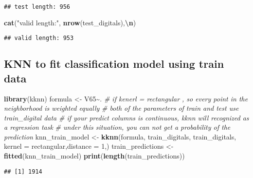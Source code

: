 \documentclass[
]{article}
\newenvironment{Shaded}{\begin{snugshade}}{\end{snugshade}}
\newcommand{\AttributeTok}[1]{\textcolor[rgb]{0.13,0.29,0.53}{#1}}
\newcommand{\CommentTok}[1]{\textcolor[rgb]{0.56,0.35,0.01}{\textit{#1}}}
\newcommand{\DecValTok}[1]{\textcolor[rgb]{0.00,0.00,0.81}{#1}}
\newcommand{\FunctionTok}[1]{\textcolor[rgb]{0.13,0.29,0.53}{\textbf{#1}}}
\newcommand{\NormalTok}[1]{#1}
\newcommand{\OtherTok}[1]{\textcolor[rgb]{0.56,0.35,0.01}{#1}}
\newcommand{\SpecialCharTok}[1]{\textcolor[rgb]{0.81,0.36,0.00}{\textbf{#1}}}
\newcommand{\StringTok}[1]{\textcolor[rgb]{0.31,0.60,0.02}{#1}}
\begin{document}
\begin{verbatim}
## test length: 956
\end{verbatim}

\begin{Shaded}
\begin{Highlighting}[]
\FunctionTok{cat}\NormalTok{(}\StringTok{"valid length:"}\NormalTok{, }\FunctionTok{nrow}\NormalTok{(test\_digitals),}\StringTok{\textquotesingle{}}\SpecialCharTok{\textbackslash{}n}\StringTok{\textquotesingle{}}\NormalTok{)}
\end{Highlighting}
\end{Shaded}

\begin{verbatim}
## valid length: 953
\end{verbatim}

\subsection{KNN to fit classification model using train
data}\label{knn-to-fit-classification-model-using-train-data}

\begin{Shaded}
\begin{Highlighting}[]
\FunctionTok{library}\NormalTok{(kknn)}
\NormalTok{formula }\OtherTok{\textless{}{-}}\NormalTok{ V65}\SpecialCharTok{\textasciitilde{}}\NormalTok{.}
\CommentTok{\# if kenerl = \textquotesingle{}rectangular\textquotesingle{} , so every point in the neighborhood is weighted equally}
\CommentTok{\# both of the parameters of train and test use train\_digital data}
\CommentTok{\# if  your predict columns is continuous, kknn will recognized as a regression task}
\CommentTok{\# under this situation, you can not get a probability of the prediction}
\NormalTok{knn\_train\_model }\OtherTok{\textless{}{-}} \FunctionTok{kknn}\NormalTok{(formula, train\_digitals, train\_digitals,  }\AttributeTok{kernel =} \StringTok{\textquotesingle{}rectangular\textquotesingle{}}\NormalTok{,}\AttributeTok{distance =} \DecValTok{1}\NormalTok{,)}
\NormalTok{train\_predictions }\OtherTok{\textless{}{-}} \FunctionTok{fitted}\NormalTok{(knn\_train\_model)}
\FunctionTok{print}\NormalTok{(}\FunctionTok{length}\NormalTok{(train\_predictions))}
\end{Highlighting}
\end{Shaded}

\begin{verbatim}
## [1] 1914
\end{verbatim}
\end{document}
